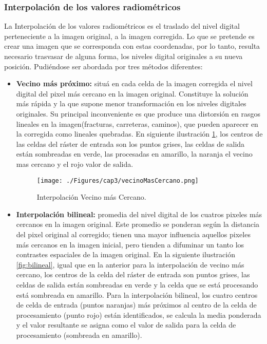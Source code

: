 \subsubsection{Interpolaci\'on de los valores radiom\'etricos}
La Interpolaci\'on de los valores radiom\'etricos es el traslado del nivel digital perteneciente a la imagen original, a la imagen corregida. Lo que se pretende es crear una imagen que se corresponda con estas coordenadas, por lo tanto, resulta necesario trasvasar de alguna forma, los niveles digital originales a su nueva posici\'on. Pudi\'endose ser abordada por tres m\'etodos diferentes:
	\begin{itemize}
		\item \textbf{Vecino m\'as pr\'oximo:} situ\'a en cada celda de la imagen corregida el nivel digital del pixel m\'as cercano en la imagen original. Constituye la soluci\'on m\'as r\'apida y la que supone menor transformaci\'on en los niveles digitales originales. Su principal inconveniente es que produce una distorsi\'on en rasgos lineales en la imagen(fracturas, carreteras, caminos), que pueden aparecer en la corregida como lineales quebradas. En siguiente ilustraci\'on \ref{fig:vecinoMasCercano}, los centros de las celdas del r\'aster de entrada son los puntos grises, las celdas de salida est\'an sombreadas en verde, las procesadas en amarillo, la naranja el vecino mas cercano y el rojo valor de salida.
		    \begin{figure}[H]
		    	\centering
		    	\texttt{[image: ./Figures/cap3/vecinoMasCercano.png]}
		    	\caption{Interpolaci\'on Vecino m\'as Cercano.}
		    	\label{fig:vecinoMasCercano}
		    \end{figure}
		\item \textbf{Interpolaci\'on bilineal:} promedia del nivel digital de los cuatros pixeles m\'as cercanos en la imagen original. Este promedio se ponderan seg\'un la distancia del pixel original al corregido; tienen una mayor influencia aquellos pixeles m\'as cercanos en la imagen inicial, pero tienden a difuminar un tanto los contrastes espaciales de la imagen original. En la siguiente ilustraci\'on \ref{fig:bilineal}, igual que en la anterior para la interpolaci\'on de vecino m\'as cercano, los centros de la celda del r\'aster de entrada son puntos grises, las celdas de salida est\'an sombreadas en verde y la celda que se est\'a procesando est\'a sombreada en amarillo. Para la interpolaci\'on bilineal, los cuatro centros de celda de entrada (puntos naranjas) m\'as pr\'oximos al centro de la celda de procesamiento (punto rojo) est\'an identificados, se calcula la media ponderada y el valor resultante se asigna como el valor de salida para la celda de procesamiento (sombreada en amarillo).

\end{itemize}
